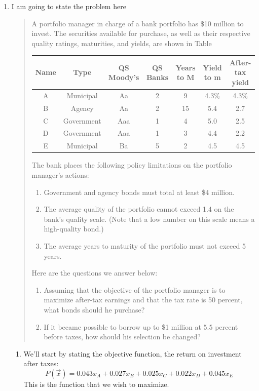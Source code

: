 \documentclass[11pt]{article}
\begin{document}
\begin{enumerate}
\item I am going to state the problem here
\begin{quote}
A portfolio manager in charge of a bank portfolio has \$10 million to invest. The
securities available for purchase, as well as their respective quality ratings, maturities, and yields, are shown
in Table

{\tiny
\begin{tabular}{c|c|c|c|c|c|c}
Name & Type & QS Moody's & QS Banks& Years to M & Yield to m& After-tax yield\\\hline
A& Municipal& Aa &2& 9& 4.3\% &4.3\%\\
B& Agency& Aa& 2& 15& 5.4& 2.7\\
C& Government& Aaa &1 &4 &5.0 &2.5\\
D &Government &Aaa& 1& 3& 4.4& 2.2\\
E& Municipal &Ba &5 &2 &4.5 &4.5
\end{tabular}}

The bank places the following policy limitations on the portfolio manager’s actions:
\begin{enumerate}
\item Government and agency bonds must total at least \$4 million.
\item  The average quality of the portfolio cannot exceed 1.4 on the bank’s quality scale. (Note that a low
number on this scale means a high-quality bond.)
\item  The average years to maturity of the portfolio must not exceed 5 years.
\end{enumerate}
 
Here are the questions we answer below:
\begin{enumerate}
\item Assuming that the objective of the portfolio manager is to maximize after-tax earnings and that the tax rate is 50 percent, what bonds should he purchase? 
\item If it became possible to borrow up to \$1 million at 5.5 percent before taxes, how should his selection be changed?
\end{enumerate}
\end{quote}

\begin{enumerate}
\item 
We'll start by stating the objective function, the return on investment after taxes:
\[
P(\vec x) = 0.043x_A + 0.027 x_B + 0.025 x_C + 0.022 x_D + 0.045 x_E
\]
This is the function that we wish to maximize.


\end{enumerate}
\end{enumerate}
\end{document}
